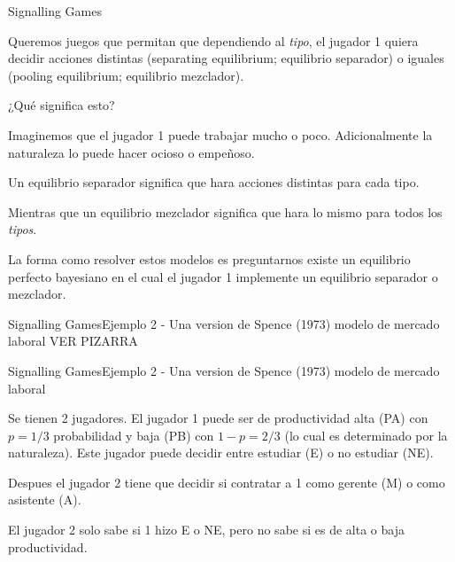 \documentclass[notes, 11pt]{beamer} %
\newenvironment{wideitemize}{\itemize\addtolength{\itemsep}{10pt}}{\enditemize}
\begin{document}
\begin{frame}{Signalling Games}
	\begin{wideitemize}
		\item<1-> Queremos juegos que permitan que dependiendo al \textit{tipo}, el jugador 1 quiera decidir acciones distintas (separating equilibrium; equilibrio separador) o iguales (pooling equilibrium; equilibrio mezclador).
		\item<2-> ¿Qu\'e significa esto?
		\begin{wideitemize}
			\item<3->[--] Imaginemos que el jugador 1 puede trabajar mucho o poco. Adicionalmente la naturaleza lo puede hacer ocioso o empe\~noso.
			\item<4->[--] Un equilibrio separador significa que hara acciones distintas para cada {tipo}.
			\item<5->[--] Mientras que un equilibrio mezclador significa que hara lo mismo para todos los \textit{tipos}.
		\end{wideitemize}

		\item<6-> La forma como resolver estos modelos es preguntarnos existe un equilibrio perfecto bayesiano en el cual el jugador 1 implemente un equilibrio separador o mezclador.
	\end{wideitemize}
\end{frame}

\begin{frame}{Signalling Games}{Ejemplo 2 - Una version de Spence (1973) modelo de mercado laboral}
VER PIZARRA
\end{frame}

\begin{frame}{Signalling Games}{Ejemplo 2 - Una version de Spence (1973) modelo de mercado laboral}
	\begin{wideitemize}
		\item<1-> Se tienen 2 jugadores. El jugador 1 puede ser de productividad alta (PA) con $p = 1/3$ probabilidad y baja (PB) con $1-p = 2/3$ (lo cual es determinado por la naturaleza). Este jugador puede decidir entre estudiar (E) o no estudiar (NE).
		\item<2-> Despues el jugador 2 tiene que decidir si contratar a 1 como gerente (M) o como asistente (A).
		\item<3-> El jugador 2 solo sabe si 1 hizo E o NE, pero no sabe si es de alta o baja productividad.
	\end{wideitemize}
\end{frame}
\end{document}
